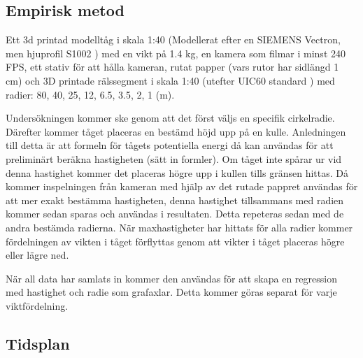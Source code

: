 \subsection{Empirisk metod}
\label{sec:metod}
Ett 3d printad modelltåg i skala 1:40 (Modellerat efter en SIEMENS Vectron, men hjuprofil S1002 \parencite{}) med en vikt på \num{1.4} kg, en kamera som filmar i minst 240 FPS, ett stativ för att hålla kameran, rutat papper (vars rutor har sidlängd 1 cm) och 3D printade rälssegment i skala 1:40 (utefter UIC60 standard \parencite{}) med radier: 80, 40, 25, 12, \num{6.5}, \num{3.5}, 2, 1 (m).

Undersökningen kommer ske genom att det först väljs en specifik cirkelradie. Därefter kommer tåget placeras en bestämd höjd upp på en kulle. Anledningen till detta är att formeln för tågets potentiella energi då kan användas för att preliminärt beräkna hastigheten (sätt in formler). Om tåget inte spårar ur vid denna hastighet kommer det placeras högre upp i kullen tills gränsen hittas. Då kommer inspelningen från kameran med hjälp av det rutade pappret användas för att mer exakt bestämma hastigheten, denna hastighet tillsammans med radien kommer sedan sparas och användas i resultaten. Detta repeteras sedan med de andra bestämda radierna. När maxhastigheter har hittats för alla radier kommer fördelningen av vikten i tåget förflyttas genom att vikter i tåget placeras högre eller lägre ned.

När all data har samlats in kommer den användas för att skapa en regression med hastighet och radie som grafaxlar. Detta kommer göras separat för varje viktfördelning.

\subsection{Tidsplan}

